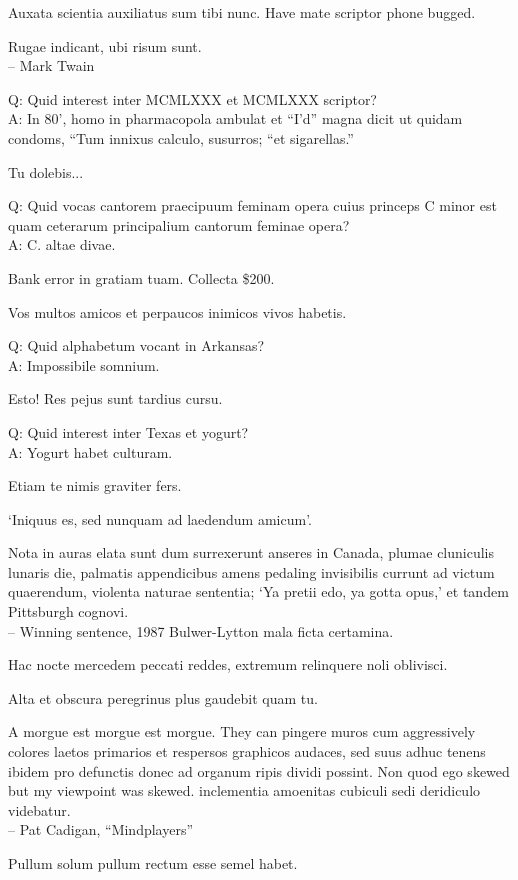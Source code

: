 \documentclass[titlepage,12pt]{memoir}
\begin{document}
Auxata scientia auxiliatus sum tibi nunc. Have mate scriptor phone bugged.

Rugae indicant, ubi risum sunt.
\\-- Mark Twain

Q: Quid interest inter MCMLXXX et MCMLXXX scriptor?\\
A: In 80’, homo in pharmacopola ambulat et “I’d” magna dicit
ut quidam condoms, “Tum innixus calculo, susurros;
“et sigarellas.”

Tu dolebis...

Q: Quid vocas cantorem praecipuum feminam opera cuius princeps C
minor est quam ceterarum principalium cantorum feminae opera?\\
A: C. altae divae.

Bank error in gratiam tuam. Collecta \$200.

Vos multos amicos et perpaucos inimicos vivos habetis.

Q: Quid alphabetum vocant in Arkansas?\\
A: Impossibile somnium.

Esto! Res pejus sunt tardius cursu.

Q: Quid interest inter Texas et yogurt?\\
A: Yogurt habet culturam.

Etiam te nimis graviter fers.

‘Iniquus es, sed nunquam ad laedendum amicum’.

Nota in auras elata sunt dum surrexerunt anseres in Canada, plumae
cluniculis lunaris die, palmatis appendicibus amens pedaling invisibilis
currunt ad victum quaerendum, violenta naturae sententia;
‘Ya pretii edo, ya gotta opus,’ et tandem Pittsburgh cognovi.
\\-- Winning sentence, 1987 Bulwer-Lytton mala ficta certamina.

 Hac nocte mercedem peccati reddes, extremum relinquere noli oblivisci.

Alta et obscura peregrinus plus gaudebit quam tu.

A morgue est morgue est morgue. They can pingere muros cum aggressively
colores laetos primarios et respersos graphicos audaces, sed suus adhuc tenens
ibidem pro defunctis donec ad organum ripis dividi possint. Non quod ego
skewed but my viewpoint was skewed. inclementia
amoenitas cubiculi sedi deridiculo videbatur.
\\-- Pat Cadigan, “Mindplayers”

Pullum solum pullum rectum esse semel habet.
\end{document}
